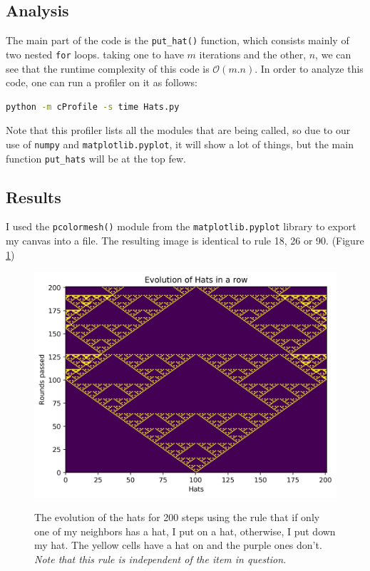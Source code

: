 \documentclass[12pt]{article}
\begin{document}
    \subsection{Analysis} \label{sec:analysis}
    The main part of the code is the \texttt{put\_hat()} function, which consists mainly of two
    nested \texttt{for} loops. taking one to have $m$ iterations and the other, $n$, we can see 
    that the runtime complexity of this code is $\mathcal{O}(m.n)$.
    In order to analyze this code, one can run a profiler on it as follows:
    \begin{lstlisting}[language=bash]
    	python -m cProfile -s time Hats.py
    \end{lstlisting}
	Note that this profiler lists all the modules that are being called, so due to our use of \texttt{numpy} and \texttt{matplotlib.pyplot}, it will show a lot of things, but the main 
	function \texttt{put\_hats} will be at the top few.
    
	
	\subsection{Results}
	I used the \texttt{pcolormesh()} module from the \texttt{matplotlib.pyplot} library to
	export my canvas into a file. The resulting image is identical to rule 18, 26 or 90. (Figure \ref{fig:hats200})
	\begin{figure}[h!]
		\includegraphics[width=\linewidth]{../P1/Hats200.jpg}
		\label{fig:hats200}
		\caption{The evolution of the hats for 200 steps using the rule that if only one of
							my neighbors has a hat, I put on a hat, otherwise, I put down my hat. The yellow cells have a hat on and the purple ones don't.
							\emph{Note that this rule is independent of the item in question.}}
	\end{figure}
\end{document}
